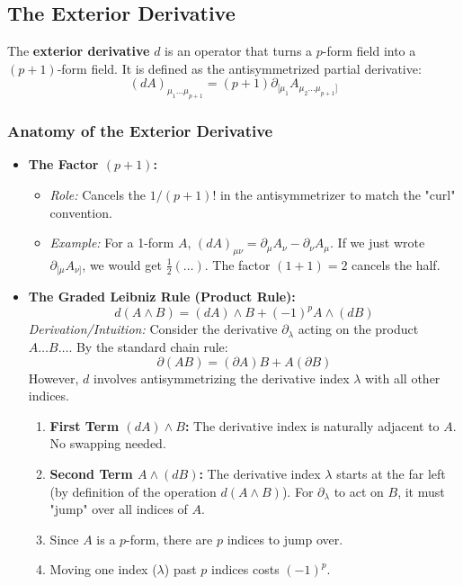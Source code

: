 \documentclass[11pt, a4paper]{report}
\begin{document}
\subsection*{The Exterior Derivative}
The \textbf{exterior derivative} $d$ is an operator that turns a $p$-form field into a $(p+1)$-form field. It is defined as the antisymmetrized partial derivative:
\begin{equation}
    (dA)_{\mu_1 \dots \mu_{p+1}} = (p+1) \partial_{[\mu_1} A_{\mu_2 \dots \mu_{p+1}]}
\end{equation}

\subsubsection*{Anatomy of the Exterior Derivative}
\begin{itemize}
    \item \textbf{The Factor $(p+1)$:}
    \begin{itemize}
        \item \textit{Role:} Cancels the $1/(p+1)!$ in the antisymmetrizer to match the "curl" convention.
        \item \textit{Example:} For a 1-form $A$, $(dA)_{\mu\nu} = \partial_\mu A_\nu - \partial_\nu A_\mu$. If we just wrote $\partial_{[\mu} A_{\nu]}$, we would get $\frac{1}{2}(\dots)$. The factor $(1+1)=2$ cancels the half.
    \end{itemize}

    \item \textbf{The Graded Leibniz Rule (Product Rule):}
    \begin{equation}
        d(A \wedge B) = (dA) \wedge B + (-1)^p A \wedge (dB)
    \end{equation}
    \textit{Derivation/Intuition:}
    Consider the derivative $\partial_\lambda$ acting on the product $A \dots B \dots$. By the standard chain rule:
    \[ \partial(AB) = (\partial A)B + A(\partial B) \]
    However, $d$ involves antisymmetrizing the derivative index $\lambda$ with all other indices.
    \begin{enumerate}
        \item \textbf{First Term $(dA) \wedge B$:} The derivative index is naturally adjacent to $A$. No swapping needed.
        \item \textbf{Second Term $A \wedge (dB)$:} The derivative index $\lambda$ starts at the far left (by definition of the operation $d(A \wedge B)$). For $\partial_\lambda$ to act on $B$, it must "jump" over all indices of $A$.
        \item Since $A$ is a $p$-form, there are $p$ indices to jump over.
        \item Moving one index ($\lambda$) past $p$ indices costs $(-1)^p$.
    \end{enumerate}
\end{itemize}
\end{document}
